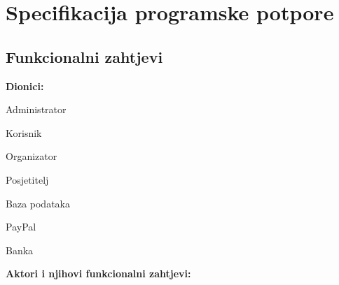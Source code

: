 \chapter{Specifikacija programske potpore}
		
	\section{Funkcionalni zahtjevi}

			
			\noindent \textbf{Dionici:}
			
			\begin{packed_enum}
				
				\item Administrator
				\item Korisnik				
				\item Organizator				
				\item Posjetitelj
				\item Baza podataka
				\item PayPal
				\item Banka
				
				
			\end{packed_enum}
			
			\noindent \textbf{Aktori i njihovi funkcionalni zahtjevi:}
			

